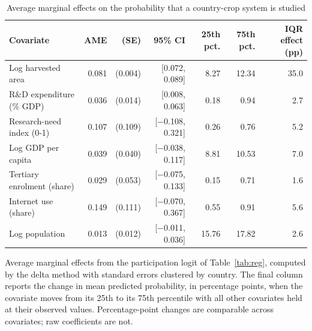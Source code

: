 \begin{table}[!t]
\centering
\caption{Average marginal effects on the probability that a country-crop system is studied}
\label{tab:ame}
\begin{tabular*}{\textwidth}{@{\extracolsep\fill}l r r r r r r@{}}
\toprule
Covariate & AME & (SE) & 95\% CI & 25th pct. & 75th pct. & IQR effect (pp) \\
\midrule
Log harvested area & 0.081 & (0.004) & [0.072, 0.089] & 8.27 & 12.34 & 35.0 \\
R\&D expenditure (\% GDP) & 0.036 & (0.014) & [0.008, 0.063] & 0.18 & 0.94 & 2.7 \\
Research-need index (0-1) & 0.107 & (0.109) & [$-$0.108, 0.321] & 0.26 & 0.76 & 5.2 \\
Log GDP per capita & 0.039 & (0.040) & [$-$0.038, 0.117] & 8.81 & 10.53 & 7.0 \\
Tertiary enrolment (share) & 0.029 & (0.053) & [$-$0.075, 0.133] & 0.15 & 0.71 & 1.6 \\
Internet use (share) & 0.149 & (0.111) & [$-$0.070, 0.367] & 0.55 & 0.91 & 5.6 \\
Log population & 0.013 & (0.012) & [$-$0.011, 0.036] & 15.76 & 17.82 & 2.6 \\
\bottomrule
\end{tabular*}
\begin{tablenotes}
\item[] Average marginal effects from the participation logit of Table~\ref{tab:reg}, computed by the delta method with standard errors clustered by country. The final column reports the change in mean predicted probability, in percentage points, when the covariate moves from its 25th to its 75th percentile with all other covariates held at their observed values. Percentage-point changes are comparable across covariates; raw coefficients are not.
\end{tablenotes}
\end{table}
